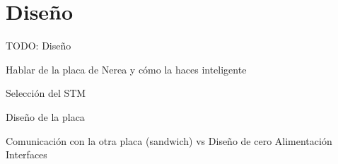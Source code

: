\chapter{Diseño\label{sec:diseño}}

TODO: Diseño

Hablar de la placa de Nerea y cómo la haces inteligente

Selección del STM

Diseño de la placa

	Comunicación con la otra placa (sandwich) vs Diseño de cero
	Alimentación
	Interfaces
